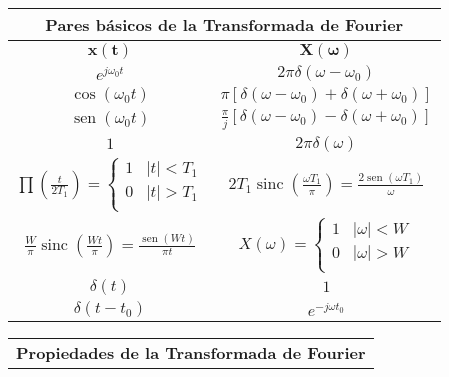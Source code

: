 \documentclass[es]{article}
\DeclareMathOperator{\sen}{sen}
\DeclareMathOperator{\sinc}{sinc}
\begin{document}
\begin{center}
    \vspace{0.5cm}

    \renewcommand{\arraystretch}{1.5}
    \begin{tabular}{|c|c|}
        \multicolumn{2}{c}{{\bf Pares básicos de la Transformada de Fourier }} \\
        \hline
        $\mathbf{x(t)}$ & $\mathbf{X(\omega)}$ \\
        \hline
        $e^{j\omega_0 t }$ & $2\pi\delta (\omega-\omega_0)$ \\
        \hline
        $\cos(\omega_0 t)$ & $\pi \left [ \delta(\omega-\omega_0 ) + \delta(\omega+\omega_0 ) \right ]$\\
        \hline
        $\sen(\omega_0 t)$ & $\displaystyle\frac{\pi}{j} \left [ \delta(\omega-\omega_0 ) - \delta(\omega+\omega_0 ) \right ]$\\
        \hline
        $1$ & $2\pi\delta(\omega)$ \\
        \hline
        $\prod \left ( \displaystyle\frac{t}{2T_1}\right ) = \left \{ \begin{array}{lc} 1 & |t| < T_1 \\ 0 & |t| >T_1 \\ \end{array} \right.$ & $2 T_1 \sinc\left ( \displaystyle\frac{\omega T_1}{\pi} \right ) = \displaystyle\frac{2 \sen(\omega T_1)}{\omega}$ \\
        \hline 
        $\displaystyle\frac{W}{\pi} \sinc\left ( \frac{Wt}{\pi} \right ) = \displaystyle\frac{\sen(Wt)}{\pi t}$ & $X(\omega) = \left \{ \begin{array}{lc} 1 & |\omega| < W \\ 0 & |\omega| >W \\ \end{array} \right. $ \\ 
        \hline 
        $\delta(t)$ & $1$ \\
        \hline
        $\delta(t-t_0)$ & $e^{-j \omega t_0}$ \\
        \hline
    \end{tabular}
    \renewcommand{\arraystretch}{1}
    \vspace{0.5cm}
    \renewcommand{\arraystretch}{1.5}
    \begin{tabular}{|c|c|}
        \multicolumn{2}{c}{{\bf Propiedades de la Transformada de Fourier }} \\

\end{tabular}
\end{center}
\end{document}
